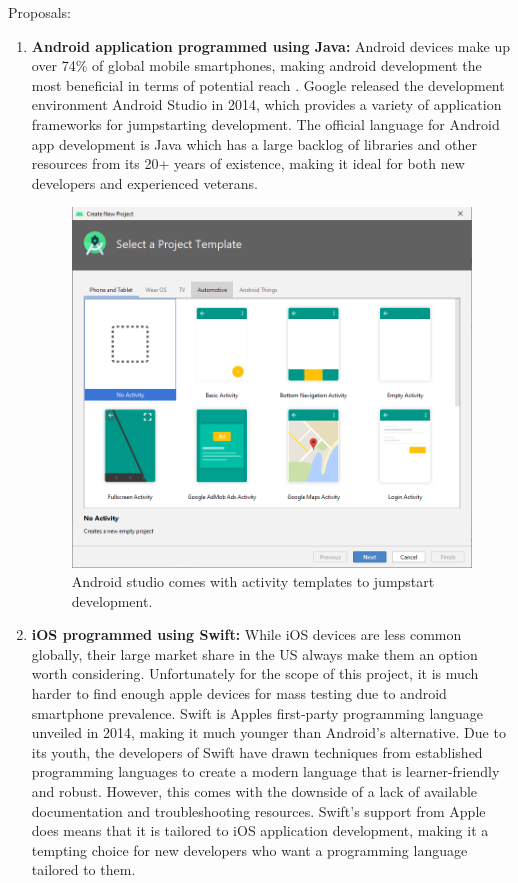 Proposals:

\begin{enumerate}
    \item \textbf{Android application programmed using Java:} Android devices make up over 74\% of global mobile smartphones, making android development the most beneficial in terms of potential reach \cite{StatCounter}. Google released the development environment Android Studio in 2014, which provides a variety of application frameworks for jumpstarting development. The official language for Android app development is Java which has a large backlog of libraries and other resources from its 20+ years of existence, making it ideal for both new developers and experienced veterans. 
    \begin{figure}[H]
        \centering
        \includegraphics[width = .7\linewidth]{figures/AndroidStudioTemplates.PNG}
        \caption{Android studio comes with activity templates to jumpstart development.}
    \end{figure}
    \item \textbf{iOS programmed using Swift:} While iOS devices are less common globally, their large market share in the US always make them an option worth considering. Unfortunately for the scope of this project, it is much harder to find enough apple devices for mass testing due to android smartphone prevalence. Swift is Apples first-party programming language unveiled in 2014, making it much younger than Android’s alternative. Due to its youth, the developers of Swift have drawn techniques from established programming languages to create a modern language that is learner-friendly and robust. However, this comes with the downside of a lack of available documentation and troubleshooting resources. Swift’s support from Apple does means that it is tailored to iOS application development, making it a tempting choice for new developers who want a programming language tailored to them. 

\end{enumerate}
